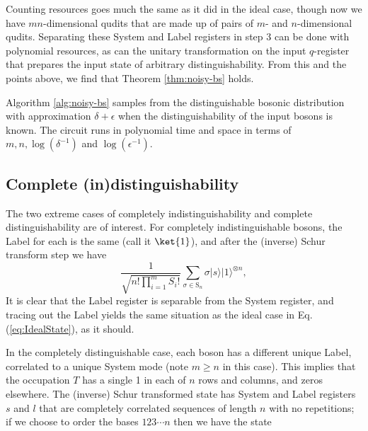 Counting resources goes much the same as it did in the ideal case, though now we have $mn$-dimensional qudits that are made up of pairs of $m$- and $n$-dimensional qudits.
Separating these System and Label registers in step 3 can be done with polynomial resources, as can the unitary transformation on the input $q$-register that prepares the input state of arbitrary distinguishability.
From this and the points above, we find that Theorem \ref{thm:noisy-bs} holds.
\begin{theorem}
Algorithm \ref{alg:noisy-bs} samples from the distinguishable bosonic distribution with approximation $\delta+\epsilon$ when the distinguishability of the input bosons is known. 
The circuit runs in polynomial time and space in terms of $m, n, \log(\delta^{-1})$ and $\log(\epsilon^{-1})$.
\label{thm:noisy-bs}
\end{theorem}


\subsection{Complete (in)distinguishability}

The two extreme cases of completely indistinguishability and complete distinguishability are of interest.
For completely indistinguishable bosons, the Label for each is the same (call it $\ket{1}$), and after the (inverse) Schur transform step we have
\begin{equation}
\frac{1}{\sqrt{n!\prod_{i=1}^m S_{i}!}}\sum_{\sigma\in \textrm{S}_n}\sigma|s\rangle|1\rangle^{\otimes n},
\end{equation}
It is clear that the Label register is separable from the System register, and tracing out the Label yields the same situation as the ideal case in Eq.(\ref{eq:IdealState}), as it should.

In the completely distinguishable case, each boson has a different unique Label, correlated to a unique System mode (note $m\geq n$ in this case).
This implies that the occupation $T$ has a single 1 in each of $n$ rows and columns, and zeros elsewhere.
The (inverse) Schur transformed state has System and Label registers $s$ and $l$ that are completely correlated sequences of length $n$ with no repetitions; if we choose to order the bases $123\cdots n$ then we have the state


